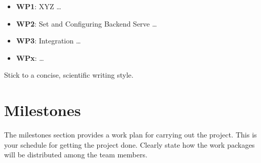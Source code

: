 \documentclass{report}
\begin{document}
\begin{itemize}
        \item {\bf WP1}:  XYZ  \ldots    
        \item {\bf WP2}: Set and Configuring Backend Serve  \ldots    
        \item {\bf WP3}: Integration  \ldots 
         \item {\bf WPx}:  \ldots 
\end{itemize}
 
Stick to a concise, scientific writing style. 

\section{Milestones}
The milestones section provides a work plan for carrying out the project.
This is your schedule for getting the project done.
Clearly state how the work packages will be distributed among the team members. 


\end{document}

